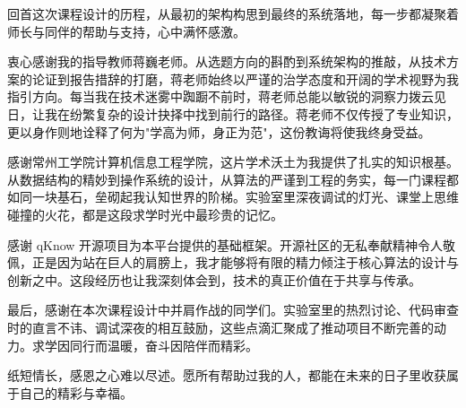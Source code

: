 
\begin{acknowledgements}

    回首这次课程设计的历程，从最初的架构构思到最终的系统落地，每一步都凝聚着师长与同伴的帮助与支持，心中满怀感激。

    衷心感谢我的指导教师蒋巍老师。从选题方向的斟酌到系统架构的推敲，从技术方案的论证到报告措辞的打磨，蒋老师始终以严谨的治学态度和开阔的学术视野为我指引方向。每当我在技术迷雾中踟蹰不前时，蒋老师总能以敏锐的洞察力拨云见日，让我在纷繁复杂的设计抉择中找到前行的路径。蒋老师不仅传授了专业知识，更以身作则地诠释了何为"学高为师，身正为范"，这份教诲将使我终身受益。

    感谢常州工学院计算机信息工程学院，这片学术沃土为我提供了扎实的知识根基。从数据结构的精妙到操作系统的设计，从算法的严谨到工程的务实，每一门课程都如同一块基石，垒砌起我认知世界的阶梯。实验室里深夜调试的灯光、课堂上思维碰撞的火花，都是这段求学时光中最珍贵的记忆。

    感谢 qKnow 开源项目为本平台提供的基础框架。开源社区的无私奉献精神令人敬佩，正是因为站在巨人的肩膀上，我才能够将有限的精力倾注于核心算法的设计与创新之中。这段经历也让我深刻体会到，技术的真正价值在于共享与传承。

    最后，感谢在本次课程设计中并肩作战的同学们。实验室里的热烈讨论、代码审查时的直言不讳、调试深夜的相互鼓励，这些点滴汇聚成了推动项目不断完善的动力。求学因同行而温暖，奋斗因陪伴而精彩。

    纸短情长，感恩之心难以尽述。愿所有帮助过我的人，都能在未来的日子里收获属于自己的精彩与幸福。

\end{acknowledgements}
